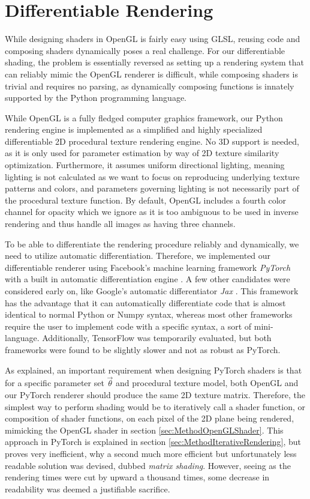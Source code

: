 \section{Differentiable Rendering}\label{sec:RenderingInDiPTeR}

While designing shaders in OpenGL is fairly easy using GLSL, reusing code and composing shaders dynamically poses a real challenge. For our differentiable shading, the problem is essentially reversed as setting up a rendering system that can reliably mimic the OpenGL renderer is difficult, while composing shaders is trivial and requires no parsing, as dynamically composing functions is innately supported by the Python programming language.

While OpenGL is a fully fledged computer graphics framework, our Python rendering engine is implemented as a simplified and highly specialized differentiable 2D procedural texture rendering engine. No 3D support is needed, as it is only used for parameter estimation by way of 2D texture similarity optimization. Furthermore, it assumes uniform directional lighting, meaning lighting is not calculated as we want to focus on reproducing underlying texture patterns and colors, and parameters governing lighting is not necessarily part of the procedural texture function. By default, OpenGL includes a fourth color channel for opacity which we ignore as it is too ambiguous to be used in inverse rendering and thus handle all images as having three channels.

To be able to differentiate the rendering procedure reliably and dynamically, we need to utilize automatic differentiation. Therefore, we implemented our differentiable renderer using Facebook's machine learning framework \textit{PyTorch} with a built in automatic differentiation engine \cite{paszke_2019_pytorch}. A few other candidates were considered early on, like Google's automatic differentiator \textit{Jax} \cite{bradbury_2018_jax}. This framework has the advantage that it can automatically differentiate code that is almost identical to normal Python or Numpy syntax, whereas most other frameworks require the user to implement code with a specific syntax, a sort of mini-language. Additionally, TensorFlow was temporarily evaluated, but both frameworks were found to be slightly slower and not as robust as PyTorch.

As explained, an important requirement when designing PyTorch shaders is that for a specific parameter set $\Vec{\theta}$ and procedural texture model, both OpenGL and our PyTorch renderer should produce the same 2D texture matrix. Therefore, the simplest way to perform shading would be to iteratively call a shader function, or composition of shader functions, on each pixel of the 2D plane being rendered, mimicking the OpenGL shader in section \ref{sec:MethodOpenGLShader}. This approach in PyTorch is explained in section \ref{sec:MethodIterativeRendering}, but proves very inefficient, why a second much more efficient but unfortunately less readable solution was devised, dubbed \textit{matrix shading}. However, seeing as the rendering times were cut by upward a thousand times, some decrease in readability was deemed a justifiable sacrifice. 


